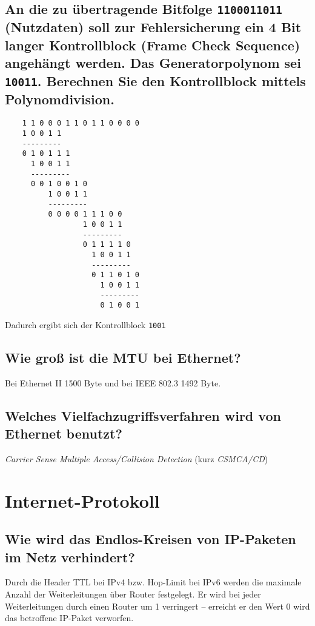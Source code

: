 \documentclass{article}
\begin{document}
\subsection{An die zu übertragende Bitfolge \texttt{1100011011} (Nutzdaten) soll zur Fehlersicherung ein 4 Bit langer Kontrollblock (Frame Check Sequence) angehängt werden. Das Generatorpolynom sei \texttt{10011}. Berechnen Sie den Kontrollblock mittels Polynomdivision.}

\begin{verbatim}
    1 1 0 0 0 1 1 0 1 1 0 0 0 0
    1 0 0 1 1
    ---------
    0 1 0 1 1 1
      1 0 0 1 1
      ---------
      0 0 1 0 0 1 0
          1 0 0 1 1
          ---------
          0 0 0 0 1 1 1 0 0
                  1 0 0 1 1
                  ---------
                  0 1 1 1 1 0
                    1 0 0 1 1
                    ---------
                    0 1 1 0 1 0
                      1 0 0 1 1
                      ---------
                      0 1 0 0 1
\end{verbatim}

Dadurch ergibt sich der Kontrollblock \texttt{1001}

\subsection{Wie groß ist die MTU bei Ethernet?}

Bei Ethernet II 1500 Byte und bei IEEE 802.3 1492 Byte.

\subsection{Welches Vielfachzugriffsverfahren wird von Ethernet benutzt?}

\emph{Carrier Sense Multiple Access/Collision Detection} (kurz \emph{CSMCA/CD})

\section{Internet-Protokoll}

\subsection{Wie wird das Endlos-Kreisen von IP-Paketen im Netz verhindert?}

Durch die Header TTL bei IPv4 bzw. Hop-Limit bei IPv6 werden die maximale Anzahl der Weiterleitungen über Router festgelegt.
Er wird bei jeder Weiterleitungen durch einen Router um 1 verringert – erreicht er den Wert 0 wird das betroffene IP-Paket verworfen.
\end{document}
